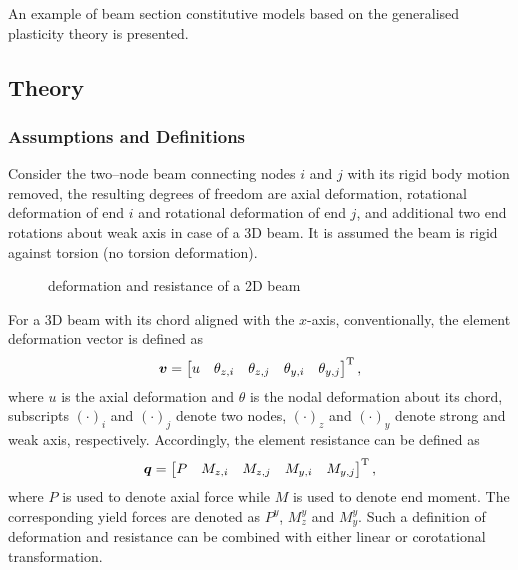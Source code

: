 An example of beam section constitutive models based on the generalised plasticity theory \cite{Auricchio1994} is presented.
\subsection{Theory}
\subsubsection{Assumptions and Definitions}
Consider the two--node beam connecting nodes $i$ and $j$ with its rigid body motion removed, the resulting degrees of freedom are axial deformation, rotational deformation of end $i$ and rotational deformation of end $j$, and additional two end rotations about weak axis in case of a 3D beam. It is assumed the beam is rigid against torsion (no torsion deformation).
\begin{figure}[H]
\centering
{}
\caption{deformation and resistance of a 2D beam}
\end{figure}

For a 3D beam with its chord aligned with the $x$-axis, conventionally, the element deformation vector is defined as
\begin{gather*}
\bm{v}=\begin{bmatrix}
u&\theta_{z,i}&\theta_{z,j}&\theta_{y,i}&\theta_{y,j}
\end{bmatrix}^{\mathrm{T}},
\end{gather*}
where $u$ is the axial deformation and $\theta$ is the nodal deformation about its chord, subscripts $\left(\cdot\right)_i$ and $\left(\cdot\right)_j$ denote two nodes, $\left(\cdot\right)_z$ and $\left(\cdot\right)_y$ denote strong and weak axis, respectively. Accordingly, the element resistance can be defined as
\begin{gather}
\bm{q}=\begin{bmatrix}
P&M_{z,i}&M_{z,j}&M_{y,i}&M_{y,j}
\end{bmatrix}^{\mathrm{T}},
\end{gather}
where $P$ is used to denote axial force while $M$ is used to denote end moment. The corresponding yield forces are denoted as $P^y$, $M_z^y$ and $M_y^y$. Such a definition of deformation and resistance can be combined with either linear or corotational transformation.

